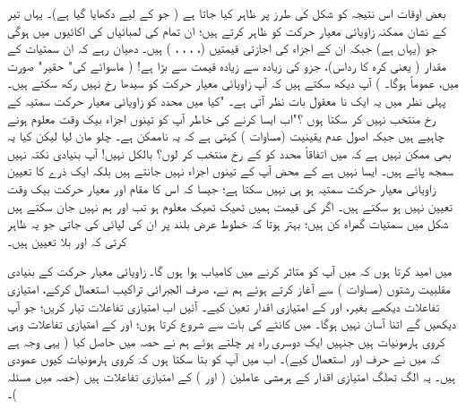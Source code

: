  بعض اوقات اس نتیجہ کو شکل  کی طرز پر ظاہر کیا جاتا ہے ( جو  کے لیے دکھایا گیا ہے)۔ یہاں تیر کے نشان ممکنہ زاویائی  معیار حرکت کو ظاہر کرتے ہیں؛  ان تمام کی لمبائیاں   کی اکائیوں میں  ہوگی جو (یہاں  ہے)  جبکہ  ان  کے  اجزاء  کی اجازتی قیمتیں (، ، ، ، )  ہیں۔  دھیان رہے کہ ان سمتیات  کے مقدار (  یعنی کرہ کا رداس)،    جزو کی زیادہ سے زیادہ قیمت سے بڑا ہے! (  ماسوائے  کی" حقیر"  صورت میں،   عموماً  ہوگا۔  )  آپ دیکھ سکتے ہیں کہ آپ زاویائی معیار حرکت کو سیدھا   رخ نہیں رکھ سکتے ہیں۔ پہلی نظر میں یہ ایک نا معقول بات نظر آتی ہے۔ "کیا میں  محدد کو زاویائی معیار حرکت سمتیہ کے رخ منتخب نہیں کر سکتا ہوں ؟"اب ایسا کرنے کی خاطر آپ کو تینوں اجزاء بیک وقت معلوم ہونے چاہیے ہیں جبکہ اصول عدم یقینیت  (مساوات  )   کہتی ہے کہ یہ ناممکن ہے۔  چلو  مان لیا لیکن کیا یہ بھی ممکن نہیں ہے کہ میں اتفاقاً   محدد کو  کے رخ منتخب  کر    لوں؟     بالکل نہیں!  آپ بنیادی نکتہ نہیں سمجھ پائے  ہیں۔  ایسا نہیں ہے کے  محض آپ   کے تینوں اجزاء نہیں جانتے ہیں بلکہ ایک ذرے   کا   تعیین زاویائی معیار حرکت سمتیہ  ہو ہی  نہیں  سکتا ہے؛  جیسا کہ اس کا مقام اور معیار حرکت بیک وقت تعیین  نہیں ہو سکتے ہیں۔ اگر  کی قیمت  ہمیں ٹھیک ٹھیک معلوم ہو تب  اور  ہم  نہیں جان سکتے ہیں  شکل    میں سمتیات گمراہ کن ہیں؛  بہتر ہوتا کہ خطوط عرض بلند پر  ان کی لپائی کی جاتی جو یہ ظاہر کرتی کہ  اور  بلا تعیین  ہیں۔

 میں امید کرتا ہوں کہ میں آپ کو متاثر کرنے میں کامیاب ہوا ہوں گا۔  زاویائی معیار حرکت کے بنیادی مقلبیت رشتوں   (مساوات ) سے آغاز کرتے ہوئے ہم نے،  صرف الجبرائی تراکیب استعمال کرکے،  امتیازی تفاعلات دیکھے بغیر،   اور  کے امتیازی اقدار تعین کیے۔ آئیں  اب امتیازی تفاعلات تیار کریں؛  جو  آپ دیکھیں گے اتنا آسان نہیں ہوگا۔ میں  کانٹے  کی بات     سے شروع کرتا ہوں؛   اور  کے  امتیازی تفاعلات وہی کروی ہارمونیات ہیں جنہیں ایک دوسری راہ پر چلتے ہوئے ہم نے حصہ  میں حاصل کیا (  یہی وجہ ہے کہ میں نے حرف  اور  استعمال کیے)۔  اب میں آپ کو بتا  سکتا ہوں  کہ کروی ہارمونیات کیوں عمودی ہیں۔ یہ الگ تھلگ امتیازی اقدار کے ہرمشی عاملین (  اور )  کے امتیازی تفاعلات ہیں (حصہ  میں مسئلہ )۔ 

